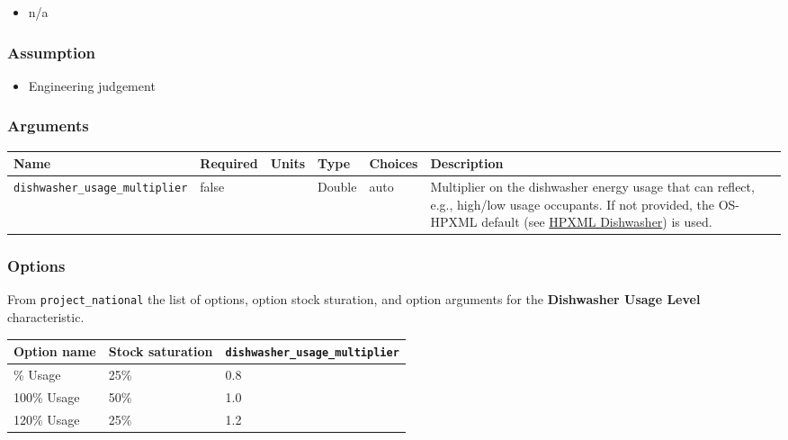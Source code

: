 \begin{itemize}
 
\item
  n/a
\end{itemize}

\subsubsection{Assumption}\label{assumption-18}

\begin{itemize}
 
\item
  Engineering judgement
\end{itemize}

\subsubsection{Arguments}\label{arguments-20}

\begin{longtable}[]{@{}llllll@{}}
\toprule\noalign{}
Name & Required & Units & Type & Choices & Description \\
\midrule\noalign{}
\endhead
\bottomrule\noalign{}
\endlastfoot
\texttt{dishwasher\_usage\_multiplier} & false & & Double & auto &
Multiplier on the dishwasher energy usage that can reflect, e.g.,
high/low usage occupants. If not provided, the OS-HPXML default (see
\href{https://openstudio-hpxml.readthedocs.io/en/v1.7.0/workflow_inputs.html\#hpxml-dishwasher}{HPXML
Dishwasher}) is used. \\
\end{longtable}

\subsubsection{Options}\label{options-33}

From \texttt{project\_national} the list of options, option stock
sturation, and option arguments for the \textbf{Dishwasher Usage Level}
characteristic.

\begin{longtable}[]{@{}lll@{}}
\toprule\noalign{}
Option name & Stock saturation &
\texttt{dishwasher\_usage\_multiplier} \\
\midrule\noalign{}
\endhead
\bottomrule\noalign{}
\endlastfoot
80\% Usage & 25\% & 0.8 \\
100\% Usage & 50\% & 1.0 \\
120\% Usage & 25\% & 1.2 \\
\end{longtable}



